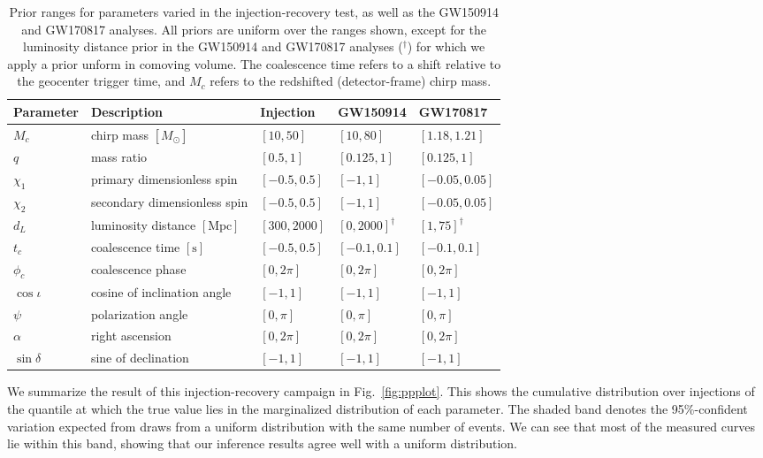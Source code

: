 \documentclass[twocolumn]{aastex631}
\begin{document}
\begin{table*}[hbt!]
    \begin{center}
    \begin{tabular}{ l l l l l }
    \hline
    \hline
    Parameter &  Description & Injection & GW150914 & GW170817\\
    \hline

    $M_c$ & chirp mass $[M_\odot]$& $[10, 50]$ & $[10,80]$ & $[1.18,1.21]$ \\
    $q$ & mass ratio & $[0.5, 1]$ & $[0.125,1]$ & $[0.125,1]$ \\
    $\chi_1$ & primary dimensionless spin& $[-0.5, 0.5]$ & $[-1,1]$ & $[-0.05,0.05]$ \\
    $\chi_2$ & secondary dimensionless spin & $[-0.5, 0.5]$ & $[-1,1]$ & $[-0.05,0.05]$ \\
    $d_L$ & luminosity distance $[\textrm{Mpc}]$ & $[300, 2000]$ & $[0, 2000]^\dag$ & $[1, 75]^\dag$ \\
    $t_c$ & coalescence time $[\textrm{s}]$& $[-0.5, 0.5]$ & $[-0.1, 0.1]$ & $[-0.1, 0.1]$ \\
    $\phi_c$ & coalescence phase & $[0, 2\pi]$ & $[0, 2\pi]$ & $[0, 2\pi]$ \\
    $\cos{\iota}$ & cosine of inclination angle & $[-1, 1]$ & $[-1, 1]$ & $[-1, 1]$ \\
    $\psi$ & polarization angle & $[0, \pi]$ & $[0, \pi]$ & $[0, \pi]$ \\
    $\alpha$ & right ascension & $[0, 2\pi]$ & $[0, 2\pi]$ & $[0, 2\pi]$ \\
    $\sin{\delta}$ & sine of declination & $[-1, 1]$ & $[-1, 1]$ & $[-1, 1]$ \\

    \hline
    \hline
    \end{tabular}
    \caption{Prior ranges for parameters varied in the injection-recovery test,
    as well as the GW150914 and GW170817 analyses. All priors are uniform over
    the ranges shown, except for the luminosity distance prior in the GW150914
    and GW170817 analyses ($^\dag$) for which we apply a prior unform in
    comoving volume. The coalescence time refers to a shift relative to the
    geocenter trigger time, and $M_c$ refers to the redshifted (detector-frame)
    chirp mass.}
    \label{tab:parameters}
    \end{center}
\end{table*}

We summarize the result of this injection-recovery campaign in
Fig.~\ref{fig:ppplot}. This shows the cumulative distribution over injections
of the quantile at which the true value lies in the marginalized distribution
of each parameter. The shaded band denotes the 95\%-confident variation
expected from draws from a uniform distribution with the same number of events.
We can see that most of the measured curves lie within this band, showing that
our inference results agree well with a uniform distribution.
\end{document}

